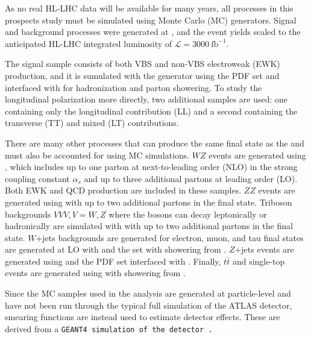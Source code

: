 As no real HL-LHC data will be available for many years, all processes in this prospects study must be simulated using Monte Carlo (MC) generators. 
Signal and background processes were generated at , and the event yields scaled to the anticipated HL-LHC integrated luminosity of $\mathcal{L}=3000~\textrm{fb}^{-1}$.


The signal sample consists of both VBS and non-VBS electroweak (EWK) \ssww production, and it is sumulated with the \mcatnlo generator \cite{2014.madgraph_mcnlo} using the \nnpdf PDF set \cite{2015.NNPDF3} and interfaced with  \cite{2015.pythia82} for hadronization and parton showering.
To study the longitudinal polarization more directly, two additional \mcatnlo \ssww samples are used: one containing only the longitudinal contribution (LL) and a second containing the transverse (TT) and mixed (LT) contributions.

There are many other processes that can produce the same final state as the \ssww and must also be accounted for using MC simulations.
$WZ$ events are generated using  \cite{2009.Sherpa, 2008.CS_Shower, 2009.METS}, which includes up to one parton at next-to-leading order (NLO) in the strong coupling constant $\alpha_s$ and up to three additional partons at leading order (LO).  
Both EWK and QCD production are included in these samples.
$ZZ$ events are generated using  with up to two additional partons in the final state.
Triboson backgrounds $VVV, V = W, Z$ where the bosons can decay leptonically or hadronically are simulated with  with up to two additional partons in the final state.
$W$+jets backgrounds are generated for electron, muon, and tau final states are generated at LO with \mcatnlo and the \nnpdf set with showering from .
$Z$+jets events are generated using \powhegbox \cite{2010.powhegbox} and the \ctten PDF set \cite{2010.ct10} interfaced with .
Finally, $t\bar{t}$ and single-top events are generated using \powhegbox with showering from .

Since the MC samples used in the analysis are generated at particle-level and have not been run through the typical full simulation of the ATLAS detector, smearing functions are instead used to estimate detector effects.
These are derived from a \tt{GEANT4} simulation of the detector \cite{2003.GEANT4}.
